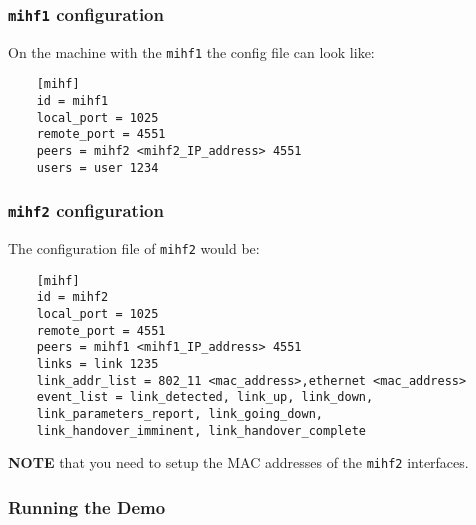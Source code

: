 \documentclass[11pt]{article}
\begin{document}
\subsubsection{\texttt{mihf1} configuration}
\label{sec-2.2.2}


    On the machine with the \texttt{mihf1} the config file can look like:\\
    \begin{verbatim}
    [mihf]
    id = mihf1
    local_port = 1025
    remote_port = 4551
    peers = mihf2 <mihf2_IP_address> 4551
    users = user 1234
    \end{verbatim}


\subsubsection{\texttt{mihf2} configuration}
\label{sec-2.2.3}

    The configuration file of \texttt{mihf2} would be: \\
    \begin{verbatim}
    [mihf]
    id = mihf2
    local_port = 1025
    remote_port = 4551
    peers = mihf1 <mihf1_IP_address> 4551
    links = link 1235
    link_addr_list = 802_11 <mac_address>,ethernet <mac_address>
    event_list = link_detected, link_up, link_down,
    link_parameters_report, link_going_down,
    link_handover_imminent, link_handover_complete
    \end{verbatim}

    \textbf{NOTE} that you need to setup the MAC addresses of the
    \texttt{mihf2} interfaces. \\

\subsubsection{Running the Demo}
\label{sec-2.2.4}
\end{document}
